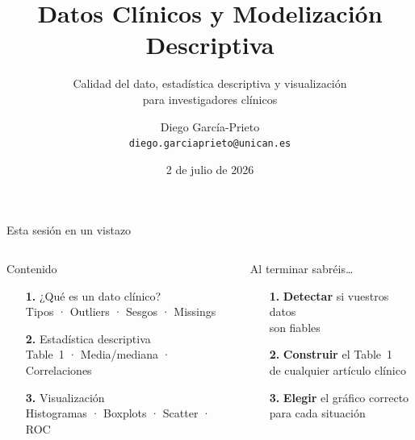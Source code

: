 \documentclass[aspectratio=169,10pt]{beamer}
\title[Datos clínicos y modelización descriptiva]{Datos Clínicos y Modelización Descriptiva}
\subtitle{Calidad del dato, estadística descriptiva y visualización\\para investigadores clínicos}
\author[Diego García-Prieto]{%
  Diego García-Prieto\\[1mm]
  {\small\texttt{diego.garciaprieto@unican.es}}}
\institute[UC]{Dpto.\ Matemáticas, Estadística y Computación \\Universidad de Cantabria}
\date{2 de julio de 2026}
\begin{document}



\begin{frame}
  \titlepage
\end{frame}

\begin{frame}{Esta sesión en un vistazo}
  \begin{columns}[T]
    \begin{column}{0.50\textwidth}
      \begin{block}{Contenido}
        \begin{enumerate}\small
          \item[\textbf{1.}] ¿Qué es un dato clínico?\\
                \scriptsize Tipos · Outliers · Sesgos · Missings
          \vspace{2mm}
          \item[\textbf{2.}] Estadística descriptiva\\
                \scriptsize Table~1 · Media/mediana · Correlaciones
          \vspace{2mm}
          \item[\textbf{3.}] Visualización\\
                \scriptsize Histogramas · Boxplots · Scatter · ROC
        \end{enumerate}
      \end{block}
    \end{column}
    \begin{column}{0.47\textwidth}
      \begin{exampleblock}{Al terminar sabréis\ldots}
        \begin{enumerate}\small
          \item[\textbf{1.}] \textbf{Detectar} si vuestros datos\\
                son fiables
          \vspace{3mm}
          \item[\textbf{2.}] \textbf{Construir} el Table~1\\
                de cualquier artículo clínico
          \vspace{3mm}
          \item[\textbf{3.}] \textbf{Elegir} el gráfico correcto\\
                para cada situación
        \end{enumerate}
      \end{exampleblock}
    \end{column}
  \end{columns}
\end{frame}
\end{document}

